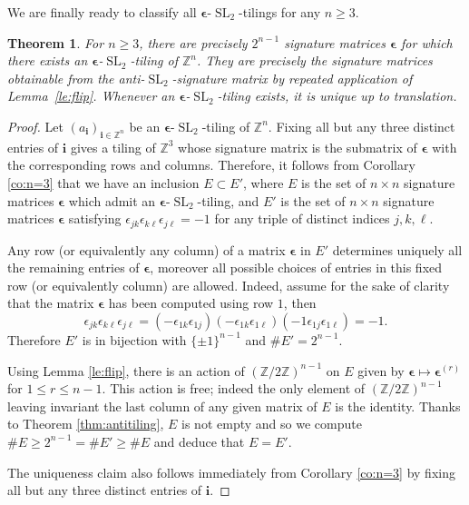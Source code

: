 \documentclass[12pt]{amsart}
\newtheorem{theorem}{Theorem}
\newcommand{\bepsilon}{\boldsymbol{\epsilon}}
\newcommand{\bi}{\boldsymbol{i}}
\newcommand{\SL}{\operatorname{SL}}
\newcommand{\ZZ}{\mathbb{Z}}
\begin{document}
  We are finally ready to classify all $\bepsilon$-$\SL_2$-tilings for any $n\geq3$.
  \begin{theorem}
    \label{thm:classification}
    For $n\geq3$, there are precisely $2^{n-1}$ signature matrices $\bepsilon$ for which there exists an $\bepsilon$-$\SL_2$-tiling of $\ZZ^n$.
    They are precisely the signature matrices obtainable from the anti-$\SL_2$-signature matrix by repeated application of Lemma~\ref{le:flip}.
    Whenever an $\bepsilon$-$\SL_2$-tiling exists, it is unique up to translation.
  \end{theorem}
  \begin{proof}
    Let $(a_{\bi})_{\bi\in\ZZ^n}$ be an $\bepsilon$-$\SL_2$-tiling of $\ZZ^n$. 
    Fixing all but any three distinct entries of $\bi$ gives a tiling of $\ZZ^3$ whose signature matrix is the submatrix of $\bepsilon$ with the corresponding rows and columns.
    Therefore, it follows from Corollary \ref{co:n=3} that we have an inclusion $E \subset E'$, where $E$ is the set of $n\times n$ signature matrices $\bepsilon$ which admit an $\bepsilon$-$\SL_2$-tiling, and $E'$ is the set of $n\times n$ signature matrices $\bepsilon$ satisfying $\epsilon_{jk} \epsilon_{k\ell} \epsilon_{j\ell} = -1$ for any triple of distinct indices $j,k,\ell$.

    Any row (or equivalently any column) of a matrix $\bepsilon$ in $E'$ determines uniquely all the remaining entries of $\bepsilon$, moreover all possible choices of entries in this fixed row (or equivalently column) are allowed.
    Indeed, assume for the sake of clarity that the matrix $\bepsilon$ has been computed using row $1$, then 
    \[
      \epsilon_{jk} \epsilon_{k\ell} \epsilon_{j\ell} = (-\epsilon_{1k}\epsilon_{1j})(-\epsilon_{1k}\epsilon_{1\ell})(-1\epsilon_{1j}\epsilon_{1\ell})=-1.
    \]
    Therefore $E'$ is in bijection with $\{\pm 1\}^{n-1}$ and $\#E'= 2^{n-1}$.

    Using Lemma \ref{le:flip}, there is an action of $(\ZZ/2\ZZ)^{n-1}$ on $E$ given by $\bepsilon \mapsto \bepsilon^{(r)}$ for $1 \leq r \leq n-1$. 
    This action is free; indeed the only element of $(\ZZ/2\ZZ)^{n-1}$ leaving invariant the last column of any given matrix of $E$ is the identity. 
    Thanks to Theorem \ref{thm:antitiling}, $E$ is not empty and so we compute $\#E \geq 2^{n-1} = \# E' \geq \#E$ and deduce that $E = E'$.

    The uniqueness claim also follows immediately from Corollary \ref{co:n=3} by fixing all but any three distinct entries of $\bi$.

  \end{proof}
\end{document}
